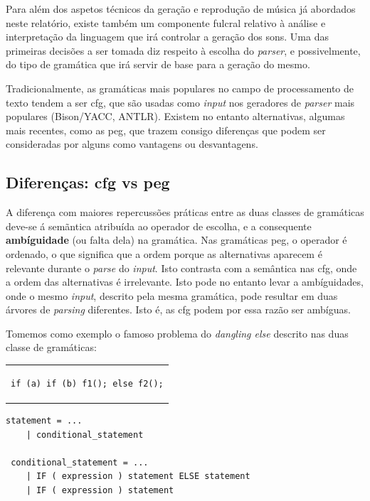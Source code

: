 \documentclass[
  oneside,
  11pt, a4paper,
  footinclude=true,
  headinclude=true,
  cleardoublepage=empty
]{scrbook}
\begin{document}
Para além dos aspetos técnicos da geração e reprodução de música já abordados neste relatório, existe também um componente fulcral relativo à análise e interpretação da linguagem que irá controlar a geração dos sons. Uma das primeiras decisões a ser tomada diz respeito à escolha do \textit{parser}, e possivelmente, do tipo de gramática que irá servir de base para a geração do mesmo.

Tradicionalmente, as gramáticas mais populares no campo de processamento de texto tendem a ser \acrfull{cfg}, que são usadas como \textit{input} nos geradores de \textit{parser} mais populares (Bison/YACC, ANTLR). Existem no entanto alternativas, algumas mais recentes, como as \acrfull{peg}, que trazem consigo diferenças que podem ser consideradas por alguns como vantagens ou desvantagens.

\subsection{Diferenças: \acrshort{cfg} vs \acrshort{peg}}

A diferença com maiores repercussões práticas entre as duas classes de gramáticas deve-se á semãntica atribuída ao operador de escolha, e a consequente \textbf{ambíguidade} (ou falta dela) na gramática. Nas gramáticas \acrshort{peg}, o operador é ordenado, o que significa que a ordem porque as alternativas aparecem é relevante durante o \textit{parse} do \textit{input}. Isto contrasta com a semântica nas \acrshort{cfg}, onde a ordem das alternativas é irrelevante. Isto pode no entanto levar a ambíguidades, onde o mesmo \textit{input}, descrito pela mesma gramática, pode resultar em duas árvores de \textit{parsing} diferentes. Isto é, as \acrshort{cfg} podem por essa razão ser ambíguas.

Tomemos como exemplo o famoso problema do \textit{dangling else}\cite{dangling-else} descrito nas duas classe de gramáticas:
\begin{center}
\begin{tabular}{c}
\begin{lstlisting}[backgroundcolor=\color{transparent}]
 if (a) if (b) f1(); else f2();
\end{lstlisting}
\end{tabular}
\end{center}

\begin{lstlisting}[caption=Gramática,captionpos=t]
 statement = ...
    | conditional_statement
 
 conditional_statement = ...
    | IF ( expression ) statement ELSE statement
    | IF ( expression ) statement
\end{lstlisting}
\end{document}
